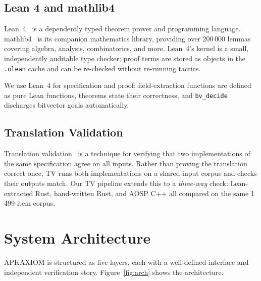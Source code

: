 \documentclass[runningheads]{llncs}
\begin{document}
\subsection{Lean 4 and mathlib4}

Lean~4~\cite{lean4} is a dependently typed theorem prover and programming
language.  mathlib4~\cite{mathlib4} is its companion mathematics library,
providing over 200\,000 lemmas covering algebra, analysis, combinatorics, and
more.  Lean~4's kernel is a small, independently auditable type checker; proof
terms are stored as objects in the \texttt{.olean} cache and can be re-checked
without re-running tactics.

We use Lean~4 for specification and proof: field-extraction functions are
defined as pure Lean functions, theorems state their correctness, and
\texttt{bv\_decide}~\cite{bvdecide} discharges bitvector goals automatically.

\subsection{Translation Validation}

Translation validation~\cite{pnueli1998} is a technique for verifying that
two implementations of the same specification agree on all inputs.  Rather than
proving the translation correct once, TV runs both implementations on a shared
input corpus and checks their outputs match.  Our TV pipeline extends this
to a \emph{three-way} check: Lean-extracted Rust, hand-written Rust, and
AOSP C++ all compared on the same 1\,499-item corpus.

\section{System Architecture}
\label{sec:arch}

APKAXIOM is structured as five layers, each with a well-defined interface and
independent verification story.  Figure~\ref{fig:arch} shows the architecture.
\end{document}
